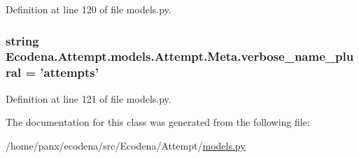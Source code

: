 Definition at line 120 of file models.py.

\hypertarget{class_ecodena_1_1_attempt_1_1models_1_1_attempt_1_1_meta_a6c17e0ddf87e78bbb89ec50ff652dd5c}{
\subsubsection[{verbose\_\-name\_\-plural}]{\setlength{\rightskip}{0pt plus 5cm}string {\bf Ecodena.Attempt.models.Attempt.Meta.verbose\_\-name\_\-plural} = 'attempts'}}
\label{d9/d75/class_ecodena_1_1_attempt_1_1models_1_1_attempt_1_1_meta_a6c17e0ddf87e78bbb89ec50ff652dd5c}


Definition at line 121 of file models.py.



The documentation for this class was generated from the following file:\begin{DoxyCompactItemize}
\item 
/home/panx/ecodena/src/Ecodena/Attempt/\hyperlink{_attempt_2models_8py}{models.py}\end{DoxyCompactItemize}
